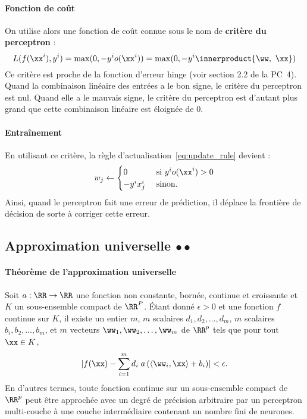 \paragraph{Fonction de coût} On utilise alors une fonction de coût connue sous
le nom de \textbf{critère du perceptron} :
\begin{equation}
  \label{eq:perceptron}
  L(f(\xx^i), y^i) = \max(0, - y^i o(\xx^i)) = 
  \max(0, - y^i \innerproduct{\ww,~\xx})
\end{equation}
Ce critère est proche de la fonction d'erreur hinge (voir section 2.2 de la
PC~4). Quand la combinaison linéaire des entrées a le bon signe, le critère du
perceptron est nul. Quand elle a le mauvais signe, le critère du perceptron est
d'autant plus grand que cette combinaison linéaire est éloignée de 0.

\paragraph{Entraînement}
En utilisant ce critère, la règle d'actualisation~\eqref{eq:update_rule}
devient :
\begin{equation*}
  \label{eq:update_rule_binclass}
  w_j \leftarrow \begin{cases}
    0 & \text{ si } y^i o(\xx^i) > 0 \\
    - y^i x_j^i & \text{ sinon.}
  \end{cases}
\end{equation*}
Ainsi, quand le perceptron fait une erreur de prédiction, il déplace la
frontière de décision de sorte à corriger cette erreur.

\subsection{Approximation universelle $\bullet \bullet$}
\label{sec:universal_approx}
\paragraph{Théorème de l'approximation universelle} 
Soit $a: \RR \rightarrow \RR$ une fonction non constante, bornée, continue et
croissante et $K$ un sous-ensemble compact de $\RR^P$. Étant donné
$\epsilon > 0$ et une fonction $f$ continue sur $K$, il existe un entier $m$,
$m$ scalaires $d_1,d_2, \ldots, d_m$, $m$ scalaires
$b_i, b_2, \ldots, b_m$, et $m$ vecteurs $\ww_1, \ww_2, \ldots, \ww_m$ de
$\RR^p$ tels que pour tout $\xx \in K$,
\begin{equation*}
  \lvert f(\xx) - \sum_{i=1}^m d_i \; a \left( \langle \ww_i, \xx \rangle + 
    b_i \right) \rvert < \epsilon.
\end{equation*}
En d'autres termes, toute fonction continue sur un sous-ensemble compact de
$\RR^p$ peut être approchée avec un degré de précision arbitraire par un
perceptron multi-couche à une couche intermédiaire contenant un nombre fini
de neurones.


